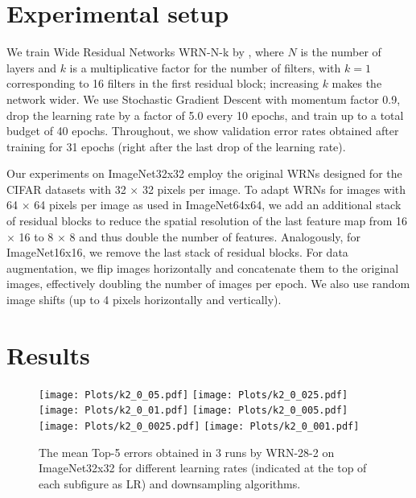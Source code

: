 \documentclass{article} \usepackage{iclr2017_conference,times}
\begin{document}
\section{Experimental setup}



We train Wide Residual Networks WRN-N-k by \cite{zagoruyko2016wide}, where $N$ is the number of layers and $k$ is a multiplicative factor for the number of filters, with $k=1$ corresponding to 16 filters in the first residual block; increasing $k$ makes the network wider. We use Stochastic Gradient Descent with momentum factor 0.9, drop the learning rate by a factor of 5.0 every 10 epochs, and train up to a total budget of 40 epochs. Throughout, we show validation error rates obtained after training for 31 epochs (right after the last drop of the learning rate). 

Our experiments on ImageNet32x32 employ the original WRNs designed for the CIFAR datasets with 32 $\times$ 32 pixels per image. To adapt WRNs for images with 64 $\times$ 64 pixels per image as used in ImageNet64x64, we add an additional stack of residual blocks to reduce the spatial resolution of the last feature map from 16 $\times$ 16 to 8 $\times$ 8 and thus double the number of features. Analogously, for ImageNet16x16, we remove the last stack of residual blocks. For data augmentation, we  flip images horizontally and concatenate them to the original images, effectively doubling the number of images per epoch. We also use random image shifts (up to 4 pixels horizontally and vertically).


\section{Results}


\begin{figure}[tbp]
\begin{center}
\texttt{[image: Plots/k2\_0\_05.pdf]}
\texttt{[image: Plots/k2\_0\_025.pdf]}
\texttt{[image: Plots/k2\_0\_01.pdf]}
\texttt{[image: Plots/k2\_0\_005.pdf]}
\texttt{[image: Plots/k2\_0\_0025.pdf]}
\texttt{[image: Plots/k2\_0\_001.pdf]}
\end{center}
\caption{The mean Top-5 errors obtained in 3 runs by WRN-28-2 on ImageNet32x32 for different learning rates (indicated at the top of each subfigure as LR) and downsampling algorithms.}
\label{Figure2}
\end{figure}
\end{document}
